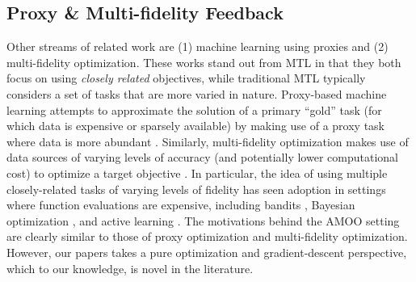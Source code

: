 \subsection{Proxy \& Multi-fidelity Feedback}
Other streams of related work are (1) machine learning using proxies and (2) multi-fidelity optimization. These works stand out from MTL in that they both focus on using \emph{closely related} objectives, while traditional MTL typically considers a set of tasks that are more varied in nature. Proxy-based machine learning attempts to approximate the solution of a primary ``gold'' task (for which data is expensive or sparsely available) by making use of a proxy task where data is more abundant \citep{bastani2021predicting,dzyabura2019accounting}. Similarly, multi-fidelity optimization makes use of data sources of varying levels of accuracy (and potentially lower computational cost) to optimize a target objective \citep{forrester2007multi}. In particular, the idea of using multiple closely-related tasks of varying levels of fidelity has seen adoption in settings where function evaluations are expensive, including bandits \citep{kandasamy2016multi,kandasamy2016gaussian}, Bayesian optimization \citep{kandasamy2017multi,song2019general,wu2020practical,takeno2020multi}, and active learning \citep{yi2021active,li2020deep,li2022batch}. The motivations behind the AMOO setting are clearly similar to those of proxy optimization and multi-fidelity optimization. However, our papers takes a pure optimization and gradient-descent perspective, which to our knowledge, is novel in the literature.










